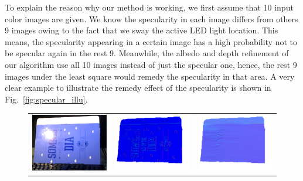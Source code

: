 To explain the reason why our method is working, we first assume that 10 input color images are given.
We know the specularity in each image differs from others 9 images owing to the fact that we sway the active LED light location.
This means, the specularity appearing in a certain image has a high probability not to be specular again in the rest 9.
Meanwhile, the albedo and depth refinement of our algorithm use all 10 images instead of just the specular one,
hence, the rest 9 images under the least square would remedy the specularity in that area.
A very clear example to illustrate the remedy effect of the specularity is shown in Fig.~\ref{fig:specular_illu}.
\begin{figure}[!ht]
\centering
\setlength{\tabcolsep}{0.1em} %
 {\renewcommand{\arraystretch}{1.6}%
\begin{tabular}{c|c c}
   \includegraphics[height = 0.24\linewidth]{figures/result/robust_folder_rgb.pdf} 
   &
   \includegraphics[height = 0.24\linewidth]{figures/result/rgbd_folder_normal.pdf} &
   \includegraphics[height = 0.24\linewidth]{figures/result/robust_folder_normal.pdf} \\


\end{tabular}}
\end{figure}
